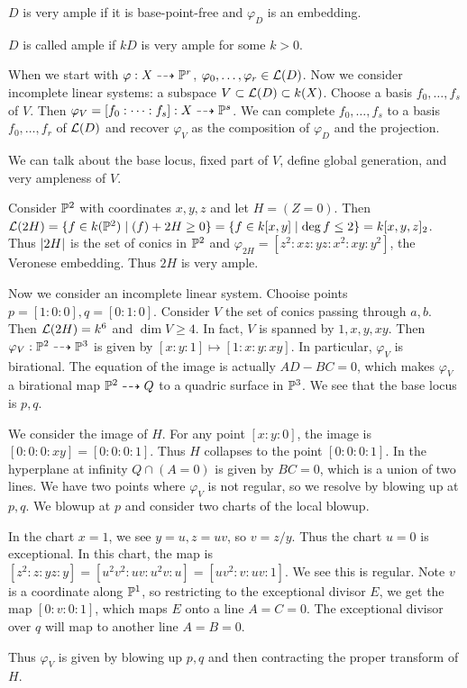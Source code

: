 \documentclass[twoside, 10pt]{article}
\begin{document}
        \begin{defn}
            $D$ is very ample if it is base-point-free and $\varphi_D$ is an embedding.
        \end{defn}

        \begin{defn}[Ample]
            $D$ is called ample if $kD$ is very ample for some $k > 0$.
        \end{defn}

        When we start with $\varphi:X \dashrightarrow \P^r$, $\varphi_0, \ldots, \varphi_r \in \mc{L}(D)$. Now we consider incomplete linear systems: a subspace $V \subset \mc{L}(D) \subset k(X)$. Choose a basis $f_0, \ldots, f_s$ of $V$. Then $\varphi_V = [f_0: \cdots : f_s]: X \dashrightarrow \P^s$. We can complete $f_0, \ldots, f_s$ to a basis $f_0, \ldots, f_r$ of $\mc{L}(D)$ and recover $\varphi_V$ as the composition of $\varphi_D$ and the projection.

        We can talk about the base locus, fixed part of $V$, define global generation, and very ampleness of $V$.

        \begin{exm}
            Consider $\P^2$ with coordinates $x,y,z$ and let $H = (Z=0)$. Then $\mc{L}(2H) = \{f \in k(\P^2) \mid (f) + 2H \geq 0 \} = \{f \in k[x,y] \mid \operatorname{deg} f \leq 2 \} = k[x,y,z]_2$. Thus $\abs{2H}$ is the set of conics in $\P^2$ and $\varphi_{2H} = [z^2:xz:yz:x^2:xy:y^2]$, the Veronese embedding. Thus $2H$ is very ample.

            Now we consider an incomplete linear system. Chooise points $p = [1:0:0],q = [0:1:0]$. Consider $V$ the set of conics passing through $a,b$. Then $\mc{L}(2H) = k^6$ and $\operatorname{dim}V \geq 4$. In fact, $V$ is spanned by $1,x,y,xy$. Then $\varphi_V: \P^2 \dashrightarrow \P^3$ is given by $[x:y:1] \mapsto [1:x:y:xy]$. In particular, $\varphi_V$ is birational. The equation of the image is actually $AD-BC = 0$, which makes $\varphi_V$ a birational map $\P^2 \dashrightarrow Q$ to a quadric surface in $\P^3$. We see that the base locus is $p,q$.

            We consider the image of $H$. For any point $[x:y:0]$, the image is $[0:0:0:xy] = [0:0:0:1]$. Thus $H$ collapses to the point $[0:0:0:1]$. In the hyperplane at infinity $Q \cap (A = 0)$ is given by $BC = 0$, which is a union of two lines. We have two points where $\varphi_V$ is not regular, so we resolve by blowing up at $p,q$. We blowup at $p$ and consider two charts of the local blowup.

            In the chart $x=1$, we see $y=u,z=uv$, so $v = z/y$. Thus the chart $u=0$ is exceptional. In this chart, the map is $[z^2:z:yz:y] = [u^2v^2:uv:u^2v:u] = [uv^2:v:uv:1]$. We see this is regular. Note $v$ is a coordinate along $\P^1$, so restricting to the exceptional divisor $E$, we get the map $[0:v:0:1]$, which maps $E$ onto a line $A=C=0$. The exceptional divisor over $q$ will map to another line $A=B=0$.

            Thus $\varphi_V$ is given by blowing up $p,q$ and then contracting the proper transform of $H$.
        \end{exm}
\end{document}
